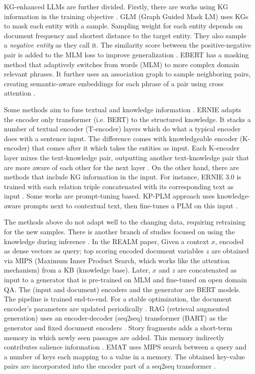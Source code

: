 \documentclass{article}
\begin{document}
KG-enhanced LLMs are further divided. Firstly, there are works using KG information in the training objective \cite{pan_unifying_2024}. GLM (Graph Guided Mask LM) uses KGs to mask each entity with a sample. Sampling weight for each entity depends on document frequency and shortest distance to the target entity. They also sample a \textit{negative entity} as they call it. The similarity score between the positive-negative pair is added to the MLM loss to improve generalization \cite{shen_exploiting_2020}. EBERT has a masking method that adaptively switches from words (MLM) to more complex domain relevant phrases. It further uses an association graph to sample neighboring pairs, creating semantic-aware embeddings for each phrase of a pair using cross attention \cite{zhang_e-bert_2021}. 

Some methods aim to fuse textual and knowledge information \cite{pan_unifying_2024}. ERNIE adapts the encoder only transformer (i.e. BERT) to the structured knowledge. It stacks a number of textual encoder (T-encoder) layers which do what a typical encoder does with a sentence input. The difference comes with knowledgeable encoder (K-encoder) that comes after it which takes the entities as input. Each K-encoder layer mixes the text-knowledge pair, outputting another text-knowledge pair that are more aware of each other for the next layer \cite{zhang_ernie_2019}. On the other hand, there are methods that include KG information in the input. For instance, ERNIE 3.0 is trained with each relation triple concatenated with its corresponding text as input \cite{sun_ernie_2021}. Some works are prompt-tuning based. KP-PLM approach uses knowledge-aware prompts next to contextual text, then fine-tunes a PLM on this input \cite{wang_knowledge_2022}.

The methods above do not adapt well to the changing data, requiring retraining for the new samples. There is another branch of studies focused on using the knowledge during inference \cite{pan_unifying_2024}. In the REALM paper, Given a context $x$, encoded as dense vectors as query; top scoring encoded document variables $z$ are obtained via MIPS (Maximum Inner Product Search, which works like the attention mechanism) from a KB (knowledge base). Later, $x$ and $z$ are concatenated as input to a generator that is pre-trained on MLM and fine-tuned on open domain QA. The (input and document) encoders and the generator are BERT models. The pipeline is trained end-to-end. For a stable optimization, the document encoder’s parameters are updated periodically \cite{guu_realm_2020}. RAG (retrieval augmented generation) uses an encoder-decoder (seq2seq) transformer (BART) as the generator and fixed document encoders \cite{lewis_retrieval-augmented_2021}. Story fragments adds a short-term memory in which newly seen passages are added. This memory indirectly contributes salience information \cite{wilmot_memory_2021}. EMAT uses MIPS search between a query and a number of keys each mapping to a value in a memory. The obtained key-value pairs are incorporated into the encoder part of a seq2seq transformer \cite{wu_efficient_2022}. 
\end{document}
